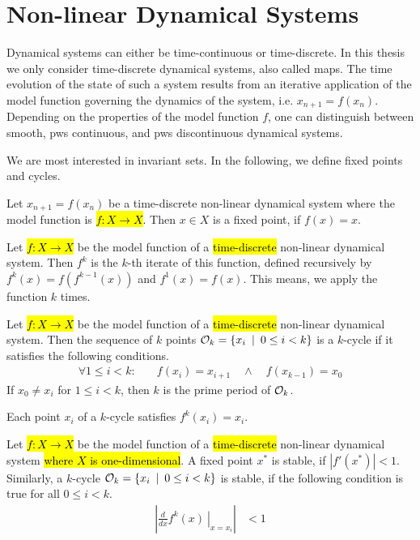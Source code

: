 \section{Non-linear Dynamical Systems}

Dynamical systems can either be time-continuous or time-discrete.
In this thesis we only consider time-discrete dynamical systems, also called maps.
The time evolution of the state of such a system results from an iterative application of the model function governing the dynamics of the system, i.e. $x_{n+1} = f(x_n)$.
Depending on the properties of the model function $f$, one can distinguish between smooth, \gls{pws} continuous, and \gls{pws} discontinuous dynamical systems.

We are most interested in invariant sets.
In the following, we define fixed points and cycles.

\begin{definition}
	Let $x_{n+1} = f(x_n)$ be a time-discrete non-linear dynamical system where the model function is \hl{$f: X \to X$}.
	Then $x \in X$ is a fixed point, if $f(x) = x$.
\end{definition}

\begin{definition}
	Let \hl{$f: X \to X$} be the model function of a \hl{time-discrete} non-linear dynamical system.
	Then $f^k$ is the $k$-th iterate of this function, defined recursively by $f^k(x) = f\left(f^{k-1}(x)\right)$ and $f^1(x) = f(x)$.
	This means, we apply the function $k$ times.
\end{definition}

\begin{definition}[Cycle]
	Let \hl{$f: X \to X$} be the model function of a \hl{time-discrete} non-linear dynamical system.
	Then the sequence of $k$ points $\mathcal{O}_k = \{x_i \:\mid\: 0 \leq i < k\}$ is a $k$-cycle if it satisfies the following conditions.
	\begin{align}
		\forall 1 \leq i < k: \quad & f(x_i) = x_{i+1} \quad \land \quad f(x_{k-1}) = x_0
	\end{align}
	If $x_0 \neq x_i$ for $1 \leq i < k$, then $k$ is the prime period of $\mathcal{O}_k$.
\end{definition}

Each point $x_i$ of a $k$-cycle satisfies $f^k(x_i) = x_i$.

\begin{definition}[Stability]
	Let \hl{$f: X \to X$} be the model function of a \hl{time-discrete} non-linear dynamical system \hl{where $X$ is one-dimensional}.
	A fixed point $x^*$ is stable, if $|f'(x^*)| < 1$.
	Similarly, a $k$-cycle $\mathcal{O}_k = \{x_i \:\mid\: 0 \leq i < k\}$ is stable, if the following condition is true for all $0 \leq i < k$.
	\begin{align}
		\left| \left. \frac{d}{dx}f^k(x) \:\right|_{x = x_i}\right| & < 1
	\end{align}
\end{definition}

